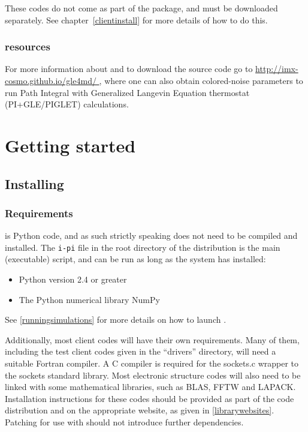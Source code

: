 \documentclass[11pt,english,fleqn]{report}
\begin{document}
These codes do not come as part of the \ipi package, and must be
downloaded separately. See chapter~\ref{clientinstall} for more details
of how to do this. 


\subsection{\ipi resources}

For more information about \ipi{} and to download the source code
go to \url{http://imx-cosmo.github.io/gle4md/ }, where one can also obtain colored-noise
parameters to run Path Integral with Generalized Langevin Equation
thermostat (PI+GLE/PIGLET) calculations.


\chapter{Getting started}

\label{getstarted}


\section{Installing \ipi}

\label{install}


\subsection{Requirements}

\ipi is Python code, and as such strictly speaking does not 
need to be compiled and installed. The {\tt i-pi} file in the
root directory of the distribution is the main (executable) script, 
and can be run as long as the system has installed:
\begin{itemize}
\item Python version 2.4 or greater
\item The Python numerical library NumPy
\end{itemize}
See \ref{runningsimulations} for more details on how to launch
\ipi.

Additionally, most client codes will have their own requirements.
Many of them, including the test client codes given in the {}``drivers''
directory, will need a suitable Fortran compiler. A C compiler is
required for the sockets.c wrapper to the sockets standard library.
Most electronic structure codes will also need to be linked with some
mathematical libraries, such as BLAS, FFTW and LAPACK. Installation
instructions for these codes should be provided as part of the code
distribution and on the appropriate website, as given in \ref{librarywebsites}.
Patching for use with \ipi{} should not introduce further dependencies.
\end{document}
